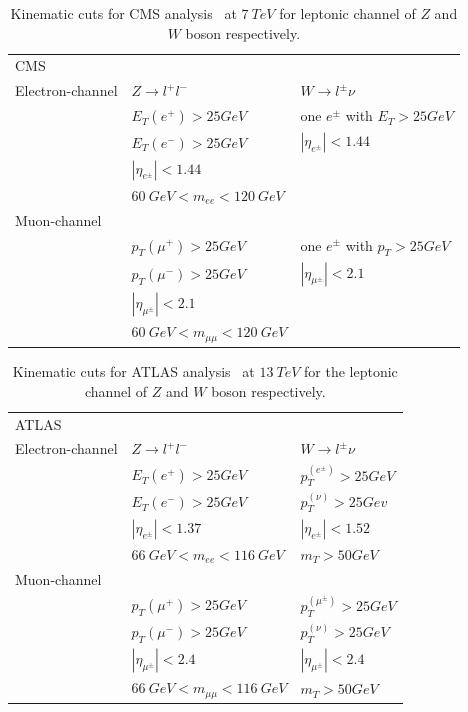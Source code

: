 \begin{table}[h!]
\centering
\caption{Kinematic cuts for CMS analysis~\cite{2011} at $7~TeV$ for leptonic channel of $Z$ and $W$ boson respectively.}
\begin{tabular}{|lp{5cm}p{5cm}|}
\hline
CMS&&\\
Electron-channel&$Z\rightarrow l^{+}l^{-}$ & $W\rightarrow l^{\pm}\nu$\\
\hline
&$E_{T}(e^{+})>25GeV$&one $ e^{\pm}$ with $E_{T}>25GeV$\\
&$E_{T}(e^{-})>25GeV$&$|\eta_{e^{\pm}}|<1.44$\\
&$|\eta_{e^{\pm}}|<1.44$&\\
&$60~GeV<m_{ee}<120~GeV$&\\
Muon-channel&&\\
\hline
&$p_{T}(\mu^{+})>25GeV$&one $ e^{\pm}$ with $p_{T}>25GeV$\\
&$p_{T}(\mu^{-})>25GeV$&$|\eta_{\mu^{\pm}}|<2.1$\\
&$|\eta_{\mu^{\pm}}|<2.1$&\\
&$60~GeV<m_{\mu\mu}<120~GeV$&\\
\hline
\end{tabular}
\label{Atlas_tab}
\end{table}

\begin{table}[h!]
\centering
\caption{Kinematic cuts for ATLAS analysis~\cite{Aad_2016} at $13~TeV$ for the leptonic channel of $Z$ and $W$ boson respectively.}
\begin{tabular}{|lp{5cm}p{5cm}|}
\hline
ATLAS&&\\
Electron-channel&$Z\rightarrow l^{+}l^{-}$ & $W\rightarrow l^{\pm}\nu$\\
\hline
&$E_{T}(e^{+})>25GeV$&$p_{T}^{(e^{\pm})}>25GeV$\\
&$E_{T}(e^{-})>25GeV$&$p_{T}^{(\nu)}>25Gev$\\
&$|\eta_{e^{\pm}}|<1.37$&$|\eta_{e^{\pm}}|<1.52$\\
&$66~GeV<m_{ee}<116~GeV$&$m_{T}>50GeV$\\
Muon-channel&&\\
\hline
&$p_{T}(\mu^{+})>25GeV$&$p_{T}^{(\mu^{\pm})}>25GeV$\\
&$p_{T}(\mu^{-})>25GeV$&$p_{T}^{(\nu)}>25GeV$\\
&$|\eta_{\mu^{\pm}}|<2.4$&$|\eta_{\mu^{\pm}}|<2.4$\\
&$66~GeV<m_{\mu\mu}<116~GeV$&$m_{T}>50GeV$\\
\hline
\end{tabular}
\label{Cms_tab}
\end{table}

